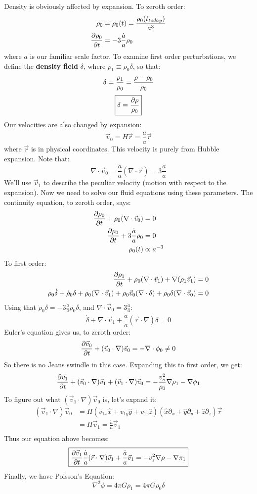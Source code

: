 \documentclass{article}
\def\aa{\frac{\dot a }{ a}}
\begin{document}
Density is obviously affected by expansion.  To zeroth order:
\begin{align}
\rho_0&=\rho_0(t)={\rho_0(t_{today})\over a^3}\\
{\partial\rho_0\over\partial t}&=-3\aa\rho_0\\
\end{align}
where $a$ is our familiar scale factor.   To examine first order perturbations,
we define the {\bf density field} $\delta$, where $\rho_1\equiv\rho_0\delta$,
so that:
$$\delta={\rho_1\over\rho_0}={\rho-\rho_0\over\rho_0}$$
$$\boxed{\delta={\partial\rho\over\rho_0}}$$
Our velocities are also changed by expansion:
$$\vec v_0=H\vec r=\aa\vec r$$
where $\vec r$ is in physical coordinates.  This velocity is purely from
Hubble expansion.  Note that:
$$\nabla\cdot\vec v_0=\aa(\nabla\cdot\vec r)=3\aa$$
We'll use $\vec v_1$ to describe the peculiar velocity (motion with respect
to the expansion).  Now we need to solve our fluid equations using these
parameters.  The continuity equation, to zeroth order, says:
\def\vvz{\vec v_0}
\def\vvo{\vec v_1}
\begin{align}
{\partial\rho_0\over\partial t}+\rho_0(\nabla\cdot\vvz)&=0\\
{\partial\rho_0\over\partial t}+3\aa\rho_0&=0\\
\rho_0(t)&\propto a^{-3}\\
\end{align}
To first order:
\begin{align}
{\partial\rho_1\over\partial t}+\rho_0(\nabla\cdot\vvo)
+\nabla(\rho_1\vvo)&=0\\
\rho_0\dot \delta+\dot \rho_0\delta+\rho_0(\nabla\cdot\vvo)+\rho_0\vvz(\nabla\cdot
\delta)+\rho_0\delta(\nabla\cdot\vvz)&=0\\
\end{align}
Using that $\dot \rho_0\delta=-3\aa\rho_0\delta$, and $\nabla\cdot\vvz=3\aa$:
$$\boxed{\dot \delta+\nabla\cdot\vvo+\aa(\vec r\cdot\nabla)\delta=0}$$
Euler's equation gives us, to zeroth order:
$${\partial\vvz\over\partial t}+(\vvz\cdot\nabla)\vvz=-\nabla\cdot\phi_0\ne0$$
So there is no Jeans swindle in this case.  Expanding this to first order,
we get:
$${\partial\vvo\over\partial t}+(\vvz\cdot\nabla)\vvo+(\vvo\cdot\nabla)\vvz
=-{v_s^2\over\rho_0}\nabla\rho_1-\nabla\phi_1$$
To figure out what $(\vvo\cdot\nabla)\vvz$ is, let's expand it:
\begin{align}
(\vvo\cdot\nabla)\vvz&=H(v_{1x}\hat x+v_{1y}\hat y+v_{1z}\hat z)(\hat x\partial_x
+\hat y\partial_y+\hat z\partial_z)\vec r\\
&=H\vvo=\aa\vvo\\
\end{align}
Thus our equation above becomes:
$$\boxed{{\partial\vvo\over\partial t}\aa(\vec r\cdot\nabla)\vvo+\aa\vvo=
-v_s^2\nabla\rho-\nabla\pi_1}$$
Finally, we have Poisson's Equation:
$$\boxed{\nabla^2\phi=4\pi G\rho_1=4\pi G\rho_0\delta}$$
\end{document}
